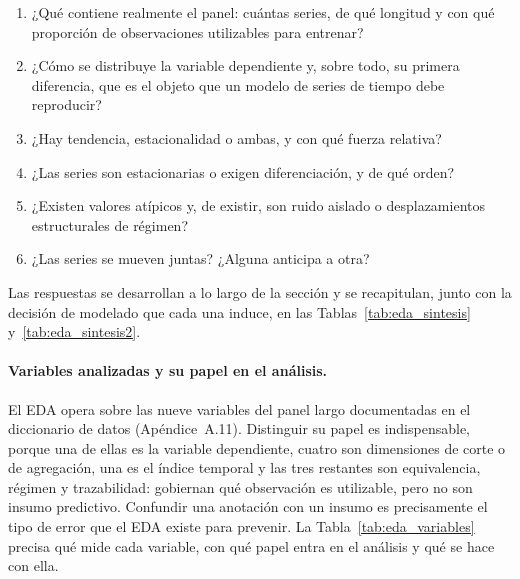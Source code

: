 \documentclass[12pt,letterpaper]{report}
\begin{document}
\begin{enumerate}[leftmargin=*, itemsep=1pt, topsep=2pt]
\item ¿Qué contiene realmente el panel: cuántas series, de qué longitud y con qué proporción
de observaciones utilizables para entrenar?
\item ¿Cómo se distribuye la variable dependiente y, sobre todo, su primera diferencia, que
es el objeto que un modelo de series de tiempo debe reproducir?
\item ¿Hay tendencia, estacionalidad o ambas, y con qué fuerza relativa?
\item ¿Las series son estacionarias o exigen diferenciación, y de qué orden?
\item ¿Existen valores atípicos y, de existir, son ruido aislado o desplazamientos
estructurales de régimen?
\item ¿Las series se mueven juntas? ¿Alguna anticipa a otra?
\end{enumerate}

Las respuestas se desarrollan a lo largo de la sección y se recapitulan, junto con la
decisión de modelado que cada una induce, en las Tablas~\ref{tab:eda_sintesis}
y~\ref{tab:eda_sintesis2}.

\paragraph{Variables analizadas y su papel en el análisis.} El EDA opera sobre las nueve
variables del panel largo documentadas en el diccionario de datos (Apéndice~A.11). Distinguir
su papel es indispensable, porque una de ellas es la variable dependiente, cuatro son
dimensiones de corte o de agregación, una es el índice temporal y las tres restantes son
equivalencia, régimen y trazabilidad: gobiernan qué observación es utilizable, pero no son
insumo predictivo. Confundir una anotación con un insumo es precisamente el tipo de error
que el EDA existe para prevenir. La Tabla~\ref{tab:eda_variables} precisa qué mide cada
variable, con qué papel entra en el análisis y qué se hace con ella.
\end{document}
